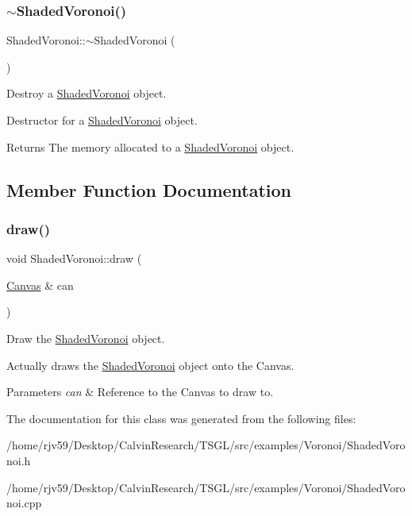 \subsubsection{\texorpdfstring{$\sim$\+Shaded\+Voronoi()}{~ShadedVoronoi()}}
{\footnotesize\ttfamily Shaded\+Voronoi\+::$\sim$\+Shaded\+Voronoi (\begin{DoxyParamCaption}{ }\end{DoxyParamCaption})\hspace{0.3cm}{\ttfamily [virtual]}}



Destroy a \hyperlink{class_shaded_voronoi}{Shaded\+Voronoi} object. 

Destructor for a \hyperlink{class_shaded_voronoi}{Shaded\+Voronoi} object. \begin{DoxyReturn}{Returns}
The memory allocated to a \hyperlink{class_shaded_voronoi}{Shaded\+Voronoi} object. 
\end{DoxyReturn}


\subsection{Member Function Documentation}
\mbox{\label{class_shaded_voronoi_a5946cbfff9ea57f504cba8235ba814be}} 
\subsubsection{\texorpdfstring{draw()}{draw()}}
{\footnotesize\ttfamily void Shaded\+Voronoi\+::draw (\begin{DoxyParamCaption}\item[{\hyperlink{classtsgl_1_1_canvas}{Canvas} \&}]{can }\end{DoxyParamCaption})}



Draw the \hyperlink{class_shaded_voronoi}{Shaded\+Voronoi} object. 

Actually draws the \hyperlink{class_shaded_voronoi}{Shaded\+Voronoi} object onto the Canvas. 
\begin{DoxyParams}{Parameters}
{\em can} & Reference to the Canvas to draw to. \\
\hline
\end{DoxyParams}


The documentation for this class was generated from the following files\+:\begin{DoxyCompactItemize}
\item 
/home/rjv59/\+Desktop/\+Calvin\+Research/\+T\+S\+G\+L/src/examples/\+Voronoi/Shaded\+Voronoi.\+h\item 
/home/rjv59/\+Desktop/\+Calvin\+Research/\+T\+S\+G\+L/src/examples/\+Voronoi/Shaded\+Voronoi.\+cpp\end{DoxyCompactItemize}
